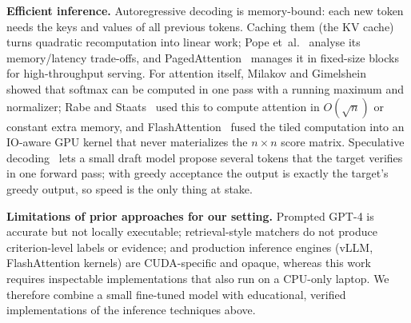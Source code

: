 \textbf{Efficient inference.} Autoregressive decoding is memory-bound: each new token needs the
keys and values of all previous tokens. Caching them (the KV cache) turns quadratic recomputation into
linear work; Pope et~al.~\cite{pope2023efficiently} analyse its memory/latency trade-offs, and
PagedAttention~\cite{kwon2023pagedattention} manages it in fixed-size blocks for high-throughput
serving. For attention itself, Milakov and Gimelshein~\cite{milakov2018online} showed that softmax can
be computed in one pass with a running maximum and normalizer; Rabe and Staats~\cite{rabe2021selfattention}
used this to compute attention in $O(\sqrt{n})$ or constant extra memory, and
FlashAttention~\cite{dao2022flashattention} fused the tiled computation into an IO-aware GPU kernel
that never materializes the $n\times n$ score matrix. Speculative decoding~\cite{leviathan2023fast,chen2023accelerating}
lets a small draft model propose several tokens that the target verifies in one forward pass; with
greedy acceptance the output is exactly the target's greedy output, so speed is the only thing at
stake.

\textbf{Limitations of prior approaches for our setting.} Prompted GPT-4 is accurate but not locally
executable; retrieval-style matchers do not produce criterion-level labels or evidence; and
production inference engines (vLLM, FlashAttention kernels) are CUDA-specific and opaque, whereas this
work requires inspectable implementations that also run on a CPU-only laptop. We therefore combine a
small fine-tuned model with educational, verified implementations of the inference techniques above.
